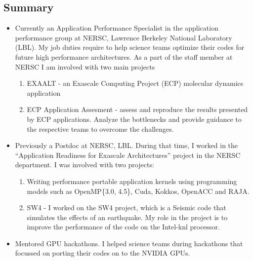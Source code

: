 \documentclass[margin]{res}
\begin{document}
%
\address{
skype\ :\ rahulkumar.gayatri\\
email\ :\ rahulgayatri84@gmail.com\\
phone-number\ :\ 19253848354
}

\begin{resume}
%
  \section{Summary}
  \begin{itemize}
      \item Currently an Application Performance Specialist in the application performance group at NERSC, Lawrence Berkeley National Laboratory (LBL).
          My job duties require to help science teams optimize their codes for future high performance architectures.
          As a part of the staff member at NERSC I am involved with two main projects
          \begin{enumerate}
              \item EXAALT - an Exascale Computing Project (ECP) molecular dynamics application
              \item ECP Application Assesment - assess and reproduce the results presented by ECP applications. Analyze the bottlenecks and provide guidance to the respective teams to overcome the challenges.
          \end{enumerate}
      \item Previously a Postdoc at NERSC, LBL.
          During that time, I worked in the \enquote{Application Readiness for Exascale Architectures} project in the NERSC department.
          I was involved with two projects:
          \begin{enumerate}
              \item Writing performance portable application kernels using programming models such as OpenMP\{3.0, 4.5\}, Cuda, Kokkos, OpenACC and RAJA.
              \item SW4 - I worked on the SW4 project, which is a Seismic code that simulates the effects of an earthquake.
                My role in the project is to improve the performance of the code on the Intel-knl processor.
          \end{enumerate}
      \item  Mentored GPU hackathons. I helped science teams during hackathons that focussed on porting their codes on to the NVIDIA GPUs.

\end{itemize}
\end{resume}
\end{document}
